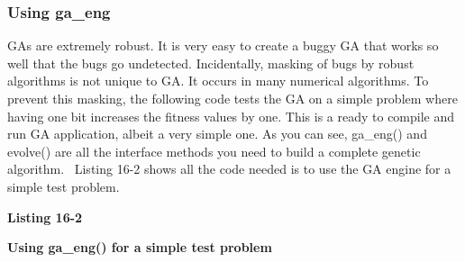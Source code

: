 
\subsubsection{Using ga\_eng}

GAs are extremely robust. It is very easy to create a buggy GA that
works so well that the bugs go undetected. Incidentally, masking of
bugs by robust algorithms is not unique to GA. It occurs in many
numerical algorithms. To prevent this masking, the following code tests
the GA on a simple problem where having one bit increases the fitness
values by one. This is a ready to compile and run GA application,
albeit a very simple one. As you can see, \textsf{ga\_eng()} and
\textsf{evolve()} are all the interface methods you need to build a
complete genetic algorithm. \ Listing 16-2 shows all the code needed is
to use the GA engine for a simple test problem.

\bigskip

{\sffamily\bfseries
Listing 16-2}

{\sffamily\bfseries
Using ga\_eng() for a simple test problem}

